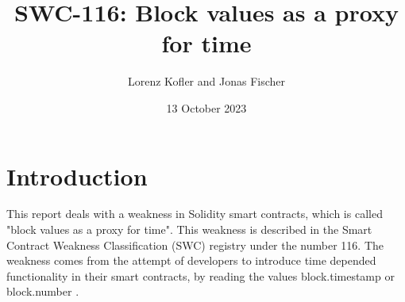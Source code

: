 \documentclass{article}
\title{SWC-116: Block values as a proxy for time}
\author{Lorenz Kofler and Jonas Fischer}
\date{13 October 2023}
\begin{document}
\maketitle
\tableofcontents
\newpage

\section{Introduction}
This report deals with a weakness in Solidity smart contracts, which is called
"block values as a proxy for time". This weakness is described in the Smart
Contract Weakness Classification (SWC) registry under the number 116. \newline
The weakness comes from the attempt of developers to introduce time depended
functionality in their smart contracts, by reading the values block.timestamp
or block.number \cite{swc116}. \newline



% 








\end{document}
